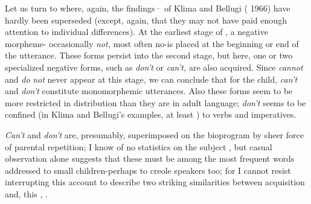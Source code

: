 Let us turn to  where, again, the findings· of Klima and Bellugi ( 1966) have hardly been superseded (except, again, that they may not have paid enough attention to individual differences). At the earliest stage of , a negative morpheme- occasionally \textit{not,} most often no-is placed at the beginning or end of the utterance. These forms persist into the second stage, but here, one or two spe\-cialized negative forms, such as \textit{don't} or \textit{can't,} are also acquired. Since \textit{cannot} and \textit{do} \textit{not} never appear at this stage, we can conclude that for the child, \textit{can't} and \textit{don't} constitute monomorphemic utterances. Also these forms seem to be more restricted in distribution than they are in adult language; \textit{don't} seems to be confined (in Klima and Bellugi's examples, at least ) to  verbs and imperatives.

\textit{Can't} and \textit{don't} are, presumably, superimposed on the bio\-program by sheer force of parental repetition; I know of no statistics on the subject , but casual observation alone suggests that these must be among the most frequent words addressed to small children-perhaps to creole speakers too; for I cannot resist interrupting this account to describe two striking similarities between acquisition and, this , .

